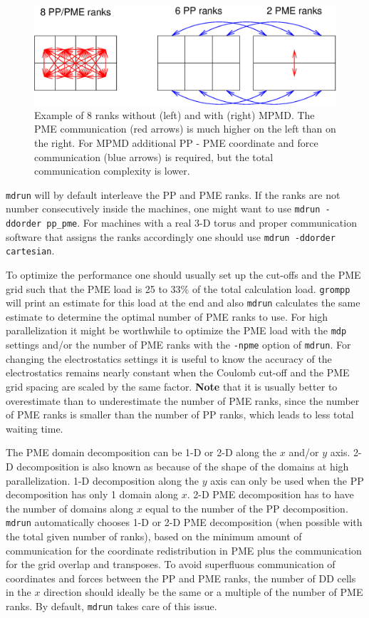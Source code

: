 \begin{figure}
\centerline{\includegraphics[width=12cm]{plots/mpmd-pme}}
\caption{
Example of 8 ranks without (left) and with (right) MPMD.
The PME communication (red arrows) is much higher on the left
than on the right. For MPMD additional PP - PME coordinate
and force communication (blue arrows) is required,
but the total communication complexity is lower.
\label{fig:mpmd_pme}
}
\end{figure}

{\tt mdrun} will by default interleave the PP and PME ranks.
If the ranks are not number consecutively inside the machines,
one might want to use {\tt mdrun -ddorder pp_pme}.
For machines with a real 3-D torus and proper communication software
that assigns the ranks accordingly one should use
{\tt mdrun -ddorder cartesian}.

To optimize the performance one should usually set up the cut-offs
and the PME grid such that the PME load is 25 to 33\% of the total
calculation load. {\tt grompp} will print an estimate for this load
at the end and also {\tt mdrun} calculates the same estimate
to determine the optimal number of PME ranks to use.
For high parallelization it might be worthwhile to optimize
the PME load with the {\tt mdp} settings and/or the number
of PME ranks with the {\tt -npme} option of {\tt mdrun}.
For changing the electrostatics settings it is useful to know
the accuracy of the electrostatics remains nearly constant
when the Coulomb cut-off and the PME grid spacing are scaled
by the same factor.
{\bf Note} that it is usually better to overestimate than to underestimate
the number of PME ranks, since the number of PME ranks is smaller
than the number of PP ranks, which leads to less total waiting time.

The PME domain decomposition can be 1-D or 2-D along the $x$ and/or
$y$ axis. 2-D decomposition is also known as  because of
the shape of the domains at high parallelization.
1-D decomposition along the $y$ axis can only be used when
the PP decomposition has only 1 domain along $x$. 2-D PME decomposition
has to have the number of domains along $x$ equal to the number of
the PP decomposition. {\tt mdrun} automatically chooses 1-D or 2-D
PME decomposition (when possible with the total given number of ranks),
based on the minimum amount of communication for the coordinate redistribution
in PME plus the communication for the grid overlap and transposes.
To avoid superfluous communication of coordinates and forces
between the PP and PME ranks, the number of DD cells in the $x$
direction should ideally be the same or a multiple of the number
of PME ranks. By default, {\tt mdrun} takes care of this issue.

